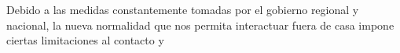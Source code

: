 Debido a las medidas constantemente tomadas por el gobierno regional y nacional, la nueva normalidad que nos permita interactuar fuera de casa impone ciertas limitaciones al contacto y




































